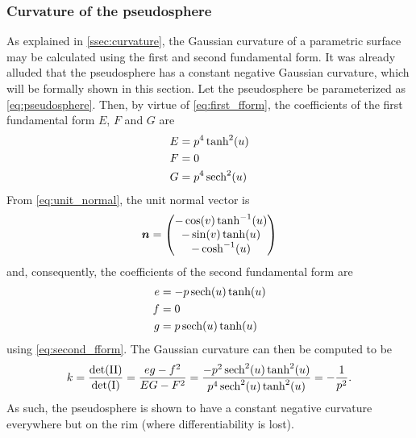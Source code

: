 \subsubsection{Curvature of the pseudosphere}
As explained in \cref{ssec:curvature}, the Gaussian curvature of a parametric surface may be calculated using the first and second fundamental form. It was already alluded that the pseudosphere has a constant negative Gaussian curvature, which will be formally shown in this section. 
Let the pseudosphere be parameterized as \cref{eq:pseudosphere}. Then, by virtue of \cref{eq:first_fform}, the coefficients of the first fundamental form \(E\), \(F\) and \(G\) are
\[
    \begin{split}
        E & = p^4\tanh[2](u) \\
        F & = 0 \\
        G & = p^4\sech[2](u) \\
    \end{split}
\]
From \cref{eq:unit_normal}, the unit normal vector is
\[
    \vec{n} 
    = \mqty(
        -\cos(v)\tanh[-1](u) \\
        -\sin(v)\tanh(u)\\
        -\cosh[-1](u)\\
    )
\]
and, consequently, the coefficients of the second fundamental form are
\begin{equation*}
    \begin{split}
        e &= -p\sech(u)\tanh(u)\\
        f &= 0\\
        g &= p\sech(u)\tanh(u)\\
    \end{split}
\end{equation*}
using \cref{eq:second_fform}. 
The Gaussian curvature can then be computed to be \cite{ONeill2006}
\begin{equation}
    k = \frac{\det(\mathrm{II})}{\det(\mathrm{I})} = \frac{eg - f^2}{EG - F^2} 
    = \frac{-p^2\sech[2](u)\tanh[2](u)}{p^4\sech[2](u)\tanh[2](u)} = -\frac{1}{p^2}.
\end{equation}
As such, the pseudosphere is shown to have a constant negative curvature everywhere but on the rim (where differentiability is lost).

